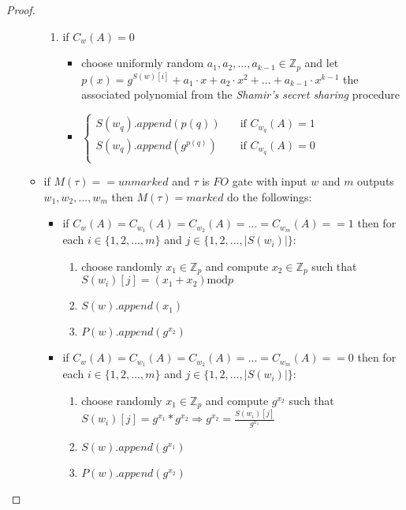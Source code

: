\documentclass[12pt]{article}
\begin{document}
\begin{proof}
\begin{itemize}
\begin{itemize}
\begin{enumerate}
    	            \item if $C_w(A) = 0$
    	            \begin{itemize}
    	                \item choose uniformly random $a_1, a_2, ..., a_{k - 1} \in \mathbb{Z}_p$ and let $p(x) = g^{S(w)[i]} + a_1 \cdot x + a_2 \cdot x^2 + ... + a_{k-1} \cdot x^{k - 1}$ the associated polynomial from the \textit{Shamir's secret sharing} procedure
    	            \item
                     $\begin{cases}
                       S(w_q).append(p(q)) &\quad\text{if } C_{w_q}(A) = 1\\
                       S(w_q).append(g^{p(q)}) &\quad \text{if } C_{w_q}(A) = 0 \\
                     \end{cases}$
    	            \end{itemize}
    	        \end{enumerate}
    	    \item if $M(\tau) == unmarked$ and $\tau$ is $FO$ gate with input $w$ and $m$ outputs $w_1, w_2, ..., w_m$ then $M(\tau) = marked$ do the followings:
    	    \begin{itemize}
    	        \item if $C_w(A) = C_{w_1}(A) = C_{w_2}(A) = ...= C_{w_m}(A) == 1$ then for each $i \in \{1, 2, ..., m\}$ and $j \in \{1, 2, ..., |S(w_i)|\}$:
    	            \begin{enumerate}
    	                \item choose randomly $x_1 \in \mathbb{Z}_p$ and compute $x_2 \in \mathbb{Z}_p$ such that $S(w_i)[j] = (x_1 + x_2)\textrm{mod}p$
    	                \item $S(w).append(x_1)$
    	                \item $P(w).append(g^{x_2})$
    	            \end{enumerate}
    	        \item if $C_w(A) = C_{w_1}(A) = C_{w_2}(A) = ...= C_{w_m}(A) == 0$ then for each $i \in \{1, 2, ..., m\}$ and $j \in \{1, 2, ..., |S(w_i)|\}$:
    	            \begin{enumerate}
    	                \item choose randomly $x_1 \in \mathbb{Z}_p$ and compute $g^{x_2}$ such that $S(w_i)[j] = g^{x_1} * g^{x_2} \Rightarrow g^{x_2} = \frac{S(w_i)[j]}{g^{x_1}} $
    	                \item $S(w).append(g^{x_1})$
    	                \item $P(w).append(g^{x_2})$
    	            \end{enumerate}
    	    \end{itemize}
    	\end{itemize} 
\end{itemize}


\end{proof}
\end{document}
